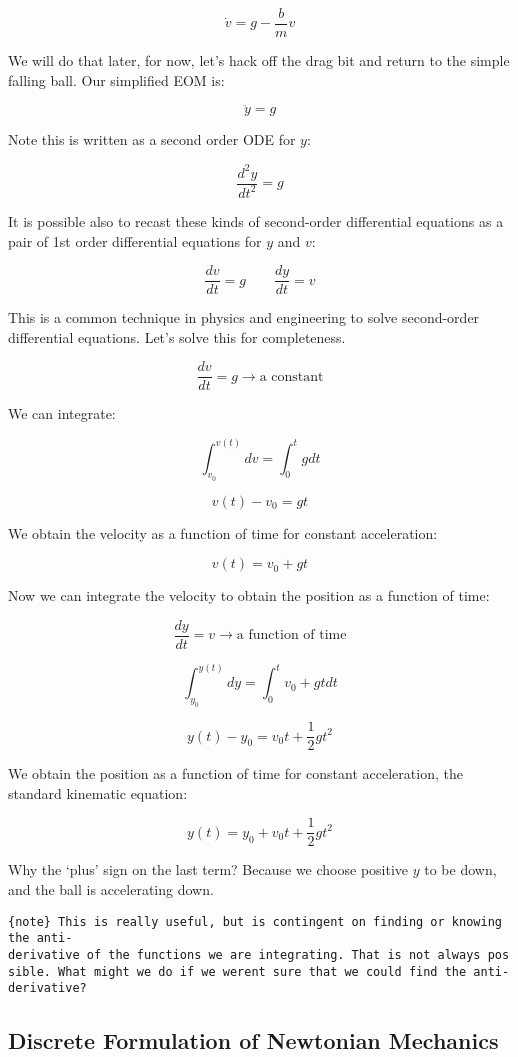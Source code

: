 \documentclass[11pt]{article}
\begin{document}
\[\dot{v} = g - \dfrac{b}{m}v\]

We will do that later, for now, let's hack off the drag bit and return
to the simple falling ball. Our simplified EOM is:

\[\ddot{y} = g\]

Note this is written as a second order ODE for \(y\):

\[\dfrac{d^2y}{dt^2} = g\]

It is possible also to recast these kinds of second-order differential
equations as a pair of 1st order differential equations for \(y\) and
\(v\):

\[\dfrac{dv}{dt} = g \qquad \dfrac{dy}{dt} = v\]

This is a common technique in physics and engineering to solve
second-order differential equations. Let's solve this for completeness.

\[\dfrac{dv}{dt} = g \longrightarrow \textrm{a constant}\]

We can integrate:

\[\int_{v_0}^{v(t)} dv = \int_{0}^{t} g dt\]

\[v(t) - v_0 = gt\]

We obtain the velocity as a function of time for constant acceleration:

\[v(t) = v_0 + gt\]

Now we can integrate the velocity to obtain the position as a function
of time:

\[\dfrac{dy}{dt} = v \longrightarrow \textrm{a function of time}\]

\[\int_{y_0}^{y(t)} dy = \int_{0}^{t} v_0 + gt dt\]

\[y(t) - y_0 = v_0 t + \dfrac{1}{2}gt^2\]

We obtain the position as a function of time for constant acceleration,
the standard kinematic equation:

\[y(t) = y_0 + v_0 t + \dfrac{1}{2}gt^2\]

Why the `plus' sign on the last term? Because we choose positive \(y\)
to be down, and the ball is accelerating down.

\texttt{\{note\}\ This\ is\ really\ useful,\ but\ is\ contingent\ on\ finding\ or\ knowing\ the\ anti-derivative\ of\ the\ functions\ we\ are\ integrating.\ That\ is\ not\ always\ possible.\ What\ might\ we\ do\ if\ we\ weren\textquotesingle{}t\ sure\ that\ we\ could\ find\ the\ anti-derivative?}

    \subsection{Discrete Formulation of Newtonian
Mechanics}\label{discrete-formulation-of-newtonian-mechanics}
\end{document}
